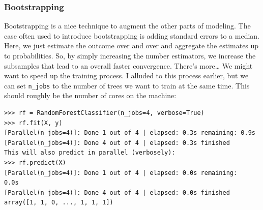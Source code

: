 \documentclass[SKL-MASTER.tex]{subfiles}
\begin{document}
\subsubsection{Bootstrapping}
Bootstrapping is a nice technique to augment the other parts of modeling. The case often used
to introduce bootstrapping is adding standard errors to a median. Here, we just estimate the
outcome over and over and aggregate the estimates up to probabilities.
So, by simply increasing the number estimators, we increase the subsamples that lead to an
overall faster convergence.
There's more…
We might want to speed up the training process. I alluded to this process earlier, but we can
set \texttt{n\_jobs} to the number of trees we want to train at the same time. This should roughly be
the number of cores on the machine:
\begin{framed}
	
\begin{verbatim}
>>> rf = RandomForestClassifier(n_jobs=4, verbose=True)
>>> rf.fit(X, y)
[Parallel(n_jobs=4)]: Done 1 out of 4 | elapsed: 0.3s remaining: 0.9s
[Parallel(n_jobs=4)]: Done 4 out of 4 | elapsed: 0.3s finished
This will also predict in parallel (verbosely):
>>> rf.predict(X)
[Parallel(n_jobs=4)]: Done 1 out of 4 | elapsed: 0.0s remaining:
0.0s
[Parallel(n_jobs=4)]: Done 4 out of 4 | elapsed: 0.0s finished
array([1, 1, 0, ..., 1, 1, 1])
\end{verbatim}
\end{framed}
\end{document}
